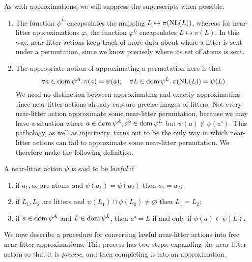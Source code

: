 As with approximations, we will suppress the superscripts when possible.

\begin{remarks}
    \begin{enumerate}
        \item The function \( \psi^L \) encapsulates the mapping \( L \mapsto \pi(\operatorname{NL}(L)) \), whereas for near-litter approximations \( \varphi \), the function \( \varphi^L \) encapsulates \( L \mapsto \pi(L) \).
        In this way, near-litter actions keep track of more data about where a litter is sent under a permutation, since we know precisely where its set of atoms is sent.
        \item The appropriate notion of approximating a permutation here is that
        \[ \forall a \in \operatorname{dom} \psi^A.\, \pi(a) = \psi(a);\quad \forall L \in \operatorname{dom} \psi^L.\, \pi(\operatorname{NL}(L)) = \psi(L) \]
        We need no distinction between approximating and exactly approximating since near-litter actions already capture precise images of litters.
        Not every near-litter action approximate some near-litter permutation, because we may have a situation where \( a \in \operatorname{dom} \psi^A, a^\circ \in \operatorname{dom} \psi^L \) but \( \psi(a) \notin \psi(a^\circ) \).
        This pathology, as well as injectivity, turns out to be the only way in which near-litter actions can fail to approximate some near-litter permutation.
        We therefore make the following definition.
    \end{enumerate}
\end{remarks}

\begin{definition}
    A near-litter action \( \psi \) is said to be \emph{lawful} if
    \begin{enumerate}
        \item if \( a_1, a_2 \) are atoms and \( \psi(a_1) = \psi(a_2) \) then \( a_1 = a_2 \);
        \item if \( L_1, L_2 \) are litters and \( \psi(L_1) \cap \psi(L_2) \neq \varnothing \) then \( L_1 = L_2 \);
        \item if \( a \in \operatorname{dom} \psi^A \) and \( L \in \operatorname{dom} \psi^L \), then \( a^\circ = L \) if and only if \( \psi(a) \in \psi(L) \).
    \end{enumerate}
\end{definition}

We now describe a procedure for converting lawful near-litter actions into free near-litter approximations.
This process has two steps: expanding the near-litter action so that it is \emph{precise}, and then completing it into an approximation.

